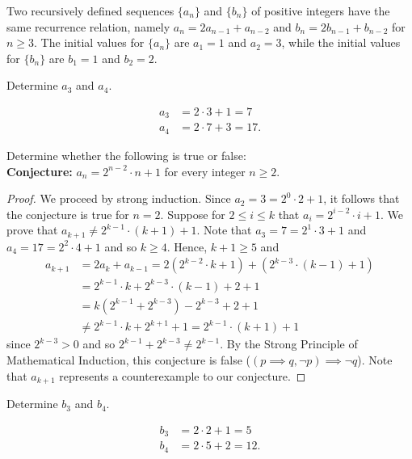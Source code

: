 \documentclass[12pt]{article}
\newenvironment{problem}[2][Problem]{\begin{trivlist}
		\item[\hskip \labelsep {\bfseries #1}\hskip \labelsep {\bfseries #2.}]}{\end{trivlist}}
\newenvironment{solution}[2][Solution]{\begin{trivlist}
		\item[\hskip \labelsep {\bfseries #1}\hskip \labelsep {\bfseries #2.}]}{\end{trivlist}}
\begin{document}
	\begin{problem}{6}
		Two recursively defined sequences $\{a_{n}\}$ and $\{b_{n}\}$ of positive integers have the same recurrence relation, namely $a_{n} = 2a_{n-1}+a_{n-2}$ and $b_{n} = 2b_{n-1}+b_{n-2}$ for $n\geq 3$. The initial values for $\{a_{n}\}$ are $a_{1} = 1$ and $a_{2} = 3$, while the initial values for $\{b_{n}\}$ are $b_{1} = 1$ and $b_{2} = 2$.
		\begin{enumerate}[label=(\alph*)]
			\item Determine $a_{3}$ and $a_{4}$.
			\begin{solution}{a}
				\begin{align*}
					a_{3} &= 2\cdot 3 +1=7\\
					a_{4} &= 2\cdot 7 + 3 = 17.
				\end{align*}
			\end{solution}
			
			\item Determine whether the following is true or false:\\
			\textbf{Conjecture:} $a_{n} = 2^{n-2}\cdot n + 1$ for every integer $n\geq 2$.
			\begin{proof}
				We proceed by strong induction. Since $a_{2} = 3 = 2^{0}\cdot 2 + 1$, it follows that the conjecture is true for $n=2$. Suppose for $2\leq i  \leq k$ that $a_{i} = 2^{i-2}\cdot i +1$. We prove that $a_{k+1} \neq 2^{k-1}\cdot (k+1) +1$. Note that $ a_{3} = 7 = 2^{1}\cdot 3 +1$ and $a_{4} = 17 = 2^{2}\cdot 4 + 1$ and so $k\geq 4$. Hence, $k+1\geq 5$ and
				\begin{align*}
					a_{k+1} &= 2a_{k}+a_{k-1} = 2\left(2^{k-2}\cdot k +1\right) + \left(2^{k-3} \cdot (k-1) +1\right)\\
					&= 2^{k-1}\cdot k + 2^{k-3}\cdot (k-1) +2+1\\
					&= k(2^{k-1}+2^{k-3}) -2^{k-3}+2+1\\
					&\neq 2^{k-1}\cdot k + 2^{k+1}+1 = 2^{k-1}\cdot (k+1) +1
				\end{align*}
				since $2^{k-3}> 0$ and so $2^{k-1}+2^{k-3} \neq 2^{k-1}$. By the Strong Principle of Mathematical Induction, this conjecture is false ($(p\implies q, \neg p) \implies \neg q$). Note that $a_{k+1}$ represents a counterexample to our conjecture.
			\end{proof}
			
			\item Determine $b_{3}$ and $b_{4}$.
			\begin{solution}{c}
				\begin{align*}
					b_{3} &= 2\cdot 2 +1 = 5\\
					b_{4} &= 2\cdot 5 +2 = 12.
				\end{align*}
			\end{solution}
		

\end{enumerate}
\end{problem}
\end{document}
